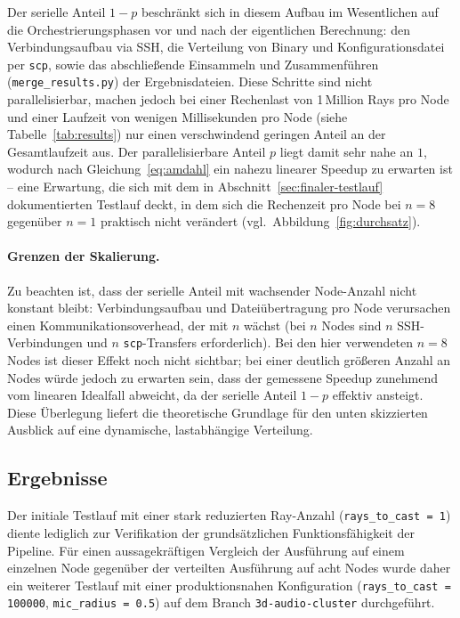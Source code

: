 \documentclass{article}
\begin{document}
Der serielle Anteil $1-p$ beschränkt sich in diesem Aufbau im Wesentlichen
auf die Orchestrierungsphasen vor und nach der eigentlichen Berechnung:
den Verbindungsaufbau via SSH, die Verteilung von Binary und
Konfigurationsdatei per \texttt{scp}, sowie das abschließende Einsammeln
und Zusammenführen (\texttt{merge\_results.py}) der Ergebnisdateien. Diese
Schritte sind nicht parallelisierbar, machen jedoch bei einer
Rechenlast von 1\,Million Rays pro Node und einer Laufzeit von wenigen
Millisekunden pro Node (siehe Tabelle~\ref{tab:results}) nur einen
verschwindend geringen Anteil an der Gesamtlaufzeit aus. Der
parallelisierbare Anteil $p$ liegt damit sehr nahe an $1$, wodurch nach
Gleichung~\eqref{eq:amdahl} ein nahezu linearer Speedup zu erwarten ist
-- eine Erwartung, die sich mit dem in Abschnitt~\ref{sec:finaler-testlauf}
dokumentierten Testlauf deckt, in dem sich die Rechenzeit pro Node bei
$n=8$ gegenüber $n=1$ praktisch nicht verändert (vgl.\ Abbildung~\ref{fig:durchsatz}).

\paragraph{Grenzen der Skalierung.}
Zu beachten ist, dass der serielle Anteil mit wachsender Node-Anzahl nicht
konstant bleibt: Verbindungsaufbau und Dateiübertragung 
pro Node
verursachen einen Kommunikationsoverhead, der mit $n$ wächst
(bei $n$ Nodes sind $n$ SSH-Verbindungen und $n$ \texttt{scp}-Transfers
erforderlich). Bei den hier verwendeten $n=8$ Nodes ist dieser Effekt noch
nicht sichtbar; bei einer deutlich größeren Anzahl an Nodes würde jedoch
zu erwarten sein, dass der gemessene Speedup zunehmend vom linearen
Idealfall abweicht, da der serielle Anteil $1-p$ effektiv ansteigt. Diese
Überlegung liefert die theoretische Grundlage für den unten skizzierten
Ausblick auf eine dynamische, lastabhängige Verteilung.

\subsection{Ergebnisse}
\label{sec:ergebnisse}
\label{sec:finaler-testlauf}
Der initiale Testlauf mit einer stark reduzierten Ray-Anzahl
(\texttt{rays\_to\_cast = 1}) diente lediglich zur Verifikation der
grundsätzlichen Funktionsfähigkeit der Pipeline. Für einen
aussagekräftigen Vergleich der Ausführung auf einem einzelnen Node
gegenüber der verteilten Ausführung auf acht Nodes wurde daher ein
weiterer Testlauf mit einer produktionsnahen Konfiguration
(\texttt{rays\_to\_cast = 100000}, \texttt{mic\_radius = 0.5}) auf dem
Branch \texttt{3d-audio-cluster} durchgeführt.
\end{document}
